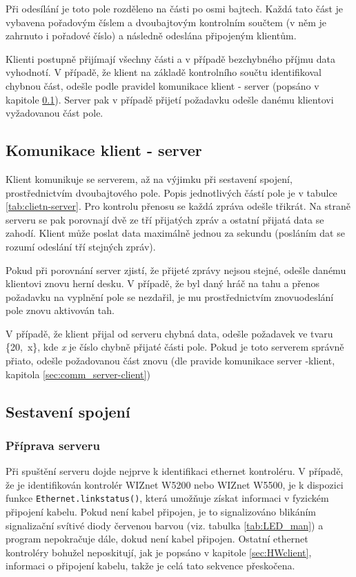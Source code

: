 Při odesílání je toto pole rozděleno na části po osmi bajtech. Každá tato část je vybavena pořadovým číslem a dvoubajtovým kontrolním součtem (v něm je zahrnuto i pořadové číslo) a následně odeslána připojeným klientům.

Klienti postupně přijímají všechny části a v případě bezchybného příjmu data vyhodnotí. V případě, že klient na základě kontrolního součtu identifikoval chybnou část, odešle podle pravidel komunikace klient - server (popsáno v kapitole \ref{sec:comm_client-server}). Server pak v případě přijetí požadavku odešle danému klientovi vyžadovanou část pole.



\subsection{Komunikace klient - server}
\label{sec:comm_client-server}
Klient komunikuje se serverem, až na výjimku při sestavení spojení, prostřednictvím dvoubajtového pole. Popis jednotlivých částí pole je v tabulce \ref{tab:clietn-server}. Pro kontrolu přenosu se každá zpráva odešle třikrát. Na straně serveru se pak porovnají dvě ze tří přijatých zpráv a ostatní přijatá data se zahodí. Klient může poslat data maximálně jednou za sekundu (posláním dat se rozumí odeslání tří stejných zpráv).

Pokud při porovnání server zjistí, že přijeté zprávy nejsou stejné, odešle danému klientovi znovu herní desku. V případě, že byl daný hráč na tahu a přenos požadavku na vyplnění pole se nezdařil, je mu prostřednictvím znovuodeslání pole znovu aktivován tah.

V případě, že klient přijal od serveru chybná data, odešle požadavek ve tvaru \mbox{\{20, x\}}, kde \textit{x} je číslo chybně přijaté části pole. Pokud je toto serverem správně přiato, odešle požadovanou část znovu (dle pravide komunikace server  -klient, kapitola \ref{sec:comm_server-client})




\subsection{Sestavení spojení}
\subsubsection{Příprava serveru}
Při spuštění serveru dojde nejprve k identifikaci ethernet kontroléru. V případě, že je identifikován kontrolér WIZnet W5200 nebo WIZnet W5500, je k dispozici funkce \texttt{Ethernet.linkstatus()}, která umožňuje získat informaci v fyzickém připojení kabelu. Pokud není kabel připojen, je to signalizováno blikáním signalizační svítivé diody červenou barvou (viz. tabulka \ref{tab:LED_man}) a program nepokračuje dále, dokud není kabel připojen. Ostatní ethernet kontroléry bohužel neposkitují, jak je popsáno v kapitole \ref{sec:HWclient}, informaci o připojení kabelu, takže je celá tato sekvence přeskočena.

